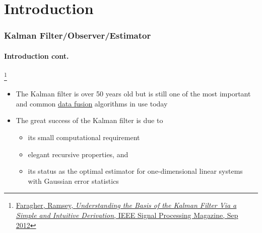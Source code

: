 \section{Introduction}





\begin{frame}
\frametitle{Kalman Filter/Observer/Estimator}
\framesubtitle{Introduction \tiny cont.}

\footnote{\tiny\hspace{-0.23in} \href{http://www.cl.cam.ac.uk/~rmf25/papers/Understanding the Basis of the Kalman Filter.pdf}{Faragher, Ramsey, \emph{Understanding the Basis of the Kalman Filter Via a Simple and Intuitive Derivation}, IEEE Signal Processing Magazine, Sep 2012}}
\scriptsize
\begin{itemize}
\item The Kalman filter is over 50 years old but is still one of the most important and common \underline{data fusion} algorithms in use today
\item The great success of the Kalman filter is due to 
\begin{itemize}\scriptsize
\item its small computational requirement
\item elegant recursive properties, and 
\item its status as the optimal estimator for one-dimensional linear systems with Gaussian error statistics
\end{itemize}
\end{itemize}
\end{frame}



